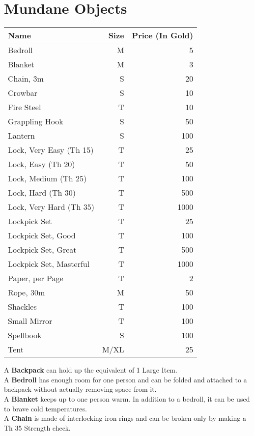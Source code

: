\section{Mundane Objects}\label{sec:mundaneObjects}
\begin{longtable}{l | r | r}
	Name & Size & Price (In Gold)\\ \hline
	Bedroll & M & 5\\
	Blanket & M & 3\\
	Chain, 3m & S & 20\\
	Crowbar & S & 10\\
	Fire Steel & T & 10\\
	Grappling Hook & S & 50\\
	Lantern & S & 100\\
	Lock, Very Easy (Th 15) & T & 25\\
	Lock, Easy (Th 20) & T & 50\\
	Lock, Medium (Th 25) & T & 100\\
	Lock, Hard (Th 30) & T & 500\\
	Lock, Very Hard (Th 35) & T & 1000\\
	Lockpick Set & T & 25\\
	Lockpick Set, Good & T & 100\\
	Lockpick Set, Great & T & 500\\
	Lockpick Set, Masterful & T & 1000\\
	Paper, per Page & T & 2\\
	Rope, 30m & M & 50\\
	Shackles & T & 100\\
	Small Mirror & T & 100\\
	Spellbook & S & 100\\
	Tent & M/XL & 25\\
\end{longtable}

A \textbf{Backpack} can hold up the equivalent of 1 Large Item.\\

A \textbf{Bedroll} has enough room for one person and can be folded and attached to a backpack without actually removing space from it.\\

A \textbf{Blanket} keeps up to one person warm.
In addition to a bedroll, it can be used to brave cold temperatures.\\

A \textbf{Chain} is made of interlocking iron rings and can be broken only by making a Th 35 Strength check.\\

